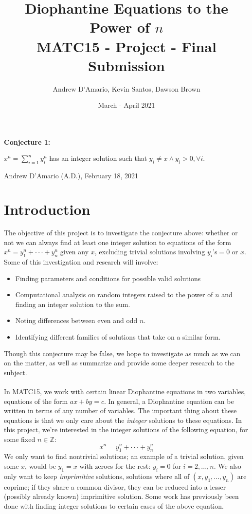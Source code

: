 \documentclass{article}
\title{Diophantine Equations to the Power of $n$ \\ \vspace{.3in} \large{MATC15 - Project - Final Submission}}
\author{Andrew D'Amario, Kevin Santos, Dawson Brown}
\date{March - April 2021}
\begin{document}
\maketitle

\begin{flushleft}
    {\bf Conjecture 1:}

    \hspace{.5in}$\displaystyle x^n=\sum^{n}_{i=1}y_i^n$ has an integer solution such that $y_i\ne x \land y_i > 0, \forall i$.

    \hspace{2in} Andrew D'Amario (A.D.), February 18, 2021

\section{Introduction}
The objective of this project is to investigate the conjecture above: whether or not we can always find at least one integer solution to equations of the form $x^n=y_1^n+\cdot\cdot\cdot+y_n^n$ given any $x$, excluding trivial solutions involving $y_i$'s$=0$ or $x$. \\
Some of this investigation and research will involve:
\begin{itemize}    
    \item Finding parameters and conditions for possible valid solutions
    \item Computational analysis on random integers raised to the power of $n$ and finding an integer solution to the sum.
    \item Noting differences between even and odd $n$.
    \item Identifying different families of solutions that take on a similar form.
\end{itemize}

Though this conjecture may be false, we hope to investigate as much as we can on the matter, as well as summarize and provide some deeper research to the subject. \\~\\

In MATC15, we work with certain linear Diophantine equations in two variables, equations of the form $ax+by=c$. In general, a Diophantine equation can be written in terms of any number of variables. The important thing about these equations is that we only care about the \textit{integer} solutions to these equations. In this project, we're interested in the integer solutions of the following equation, for some fixed $n \in \mathbb{Z}$:
\begin{equation}
    x^n=y_1^n+\cdot\cdot\cdot+y_n^n
\end{equation}
We only want to find nontrivial solutions; an example of a trivial solution, given some $x$, would be $y_1=x$ with zeroes for the rest: $y_i=0$ for $i=2, ..., n$. We also only want to keep \textit{imprimitive} solutions, solutions where all of $(x,y_1, ..., y_n)$ are coprime; if they share a common divisor, they can be reduced into a lesser (possibly already known) imprimitive solution. Some work has previously been done with finding integer solutions to certain cases of the above equation.\vspace{.1in}


\end{flushleft}
\end{document}

